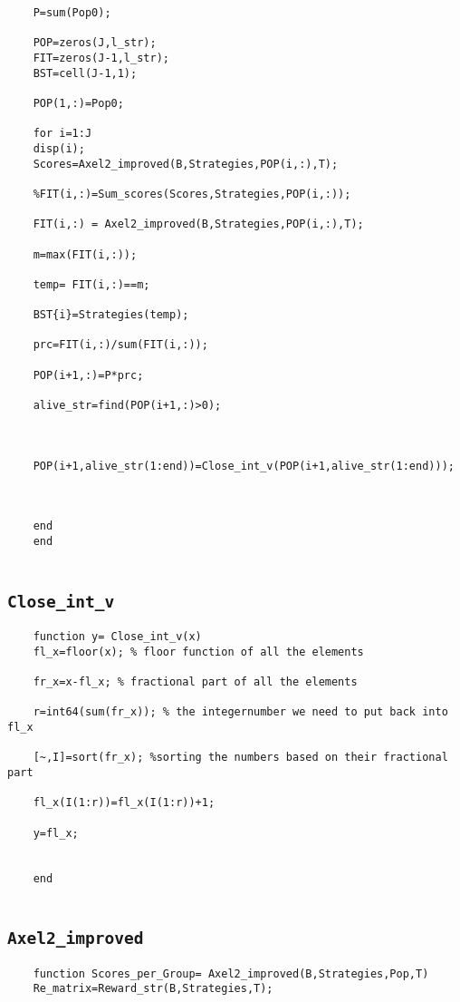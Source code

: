 \begin{appendices}
\begin{lstlisting}
	P=sum(Pop0);
	
	POP=zeros(J,l_str);
	FIT=zeros(J-1,l_str);
	BST=cell(J-1,1);
	
	POP(1,:)=Pop0;
	
	for i=1:J
	disp(i);
	Scores=Axel2_improved(B,Strategies,POP(i,:),T);
	
	%FIT(i,:)=Sum_scores(Scores,Strategies,POP(i,:));
	
	FIT(i,:) = Axel2_improved(B,Strategies,POP(i,:),T);
	
	m=max(FIT(i,:));
	
	temp= FIT(i,:)==m;
	
	BST{i}=Strategies(temp);
	
	prc=FIT(i,:)/sum(FIT(i,:));
	
	POP(i+1,:)=P*prc;
	
	alive_str=find(POP(i+1,:)>0);
	
	
	
	POP(i+1,alive_str(1:end))=Close_int_v(POP(i+1,alive_str(1:end)));
	
	
	
	end
	end
	
\end{lstlisting}
\clearpage

\subsection*{\texttt{Close\_int\_v}}{
\label{appendix:CIV}
\begin{lstlisting}
	function y= Close_int_v(x)
	fl_x=floor(x); % floor function of all the elements
	
	fr_x=x-fl_x; % fractional part of all the elements
	
	r=int64(sum(fr_x)); % the integernumber we need to put back into fl_x
	
	[~,I]=sort(fr_x); %sorting the numbers based on their fractional part
	
	fl_x(I(1:r))=fl_x(I(1:r))+1;
	
	y=fl_x;
	
	
	end
	
\end{lstlisting}
}

\subsection*{\texttt{Axel2\_improved}}
\label{appendix:A2I}

\begin{lstlisting}
	function Scores_per_Group= Axel2_improved(B,Strategies,Pop,T)
	Re_matrix=Reward_str(B,Strategies,T);
	

\end{lstlisting}
\end{appendices}
